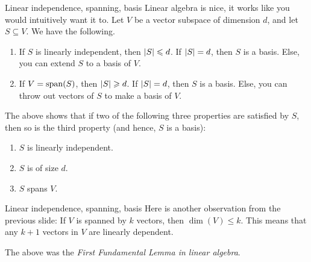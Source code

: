 \documentclass[dvipsnames]{beamer}
\theoremstyle{definition}
\let\subset\subseteq
\let\ge\geqslant
\let\le\leqslant
\begin{document}
\begin{frame}{Linear independence, spanning, basis}
    Linear algebra is nice, it works like you would intuitively want it to. Let $V$ be a vector subspace of dimension $d$, and let $S \subset V$. We have the following. \pause
    \begin{enumerate}[<+->]
        \item If $S$ is linearly independent, then $\md{S} \le d$. \pause \newline
        If ${\left\lvert S \right\lvert} = d$, then $S$ is a basis. \pause \newline
        Else, you can extend $S$ to a basis of $V$. \pause
        \item If $V = \operatorname{span}(S)$, then $\md{S} \ge d$. \pause \newline
        If ${\left\lvert S \right\lvert} = d$, then $S$ is a basis. \pause \newline
        Else, you can throw out vectors of $S$ to make a basis of $V$.
    \end{enumerate}
    \pause
    The above shows that if two of the following three properties are satisfied by $S$, then so is the third property (and hence, $S$ is a basis): \pause
    \begin{enumerate}[<+->]
        \item $S$ is linearly independent.
        \item $S$ is of size $d$.
        \item $S$ spans $V$.
    \end{enumerate}
\end{frame}
\begin{frame}{Linear independence, spanning, basis}
    Here is another observation from the previous slide: \pause If $V$ is spanned by $k$ vectors, then $\dim(V) \le k$. \pause This means that any $k + 1$ vectors in $V$ are linearly dependent. \pause

    The above was the \emph{First Fundamental Lemma in linear algebra}.
\end{frame}
\end{document}
